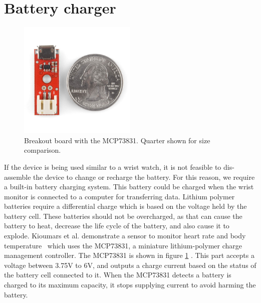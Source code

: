 \section{Battery charger}
\label{Sec:BattCharger}
\begin{figure}
\begin{center}
\includegraphics[width=0.5\textwidth]{images/MCP73Breakout.jpg}
\caption{Breakout board with the MCP73831. Quarter shown for size comparison.}
\label{Fig:MCPCharger}
\end{center}
\end{figure}
If the device is being used similar to a wrist watch,
it is not feasible to dis-assemble the device to change or recharge the battery.
For this reason, 
we require a built-in battery charging system.
This battery could be charged when the wrist monitor is connected to a computer for transferring data.
Lithium polymer batteries require a differential charge which is based on the voltage held by the battery cell.
These batteries should not be overcharged, 
as that can cause the battery to heat,
decrease the life cycle of the battery,
and also cause it to explode.
Kioumars et al. demonstrate a sensor to monitor heart rate and body temperature~\cite{kioumars2011atmega}
which uses the MCP73831, a miniature lithium-polymer charge management controller.
The MCP73831 is shown in figure \ref{Fig:MCPCharger} \cite{Web:MCPIC}.
This part accepts a voltage between 3.75V to 6V,
and outputs a charge current based on the status of the battery cell connected to it.
When the MCP73831 detects a battery is charged to its maximum capacity,
it stops supplying current to avoid harming the battery.


